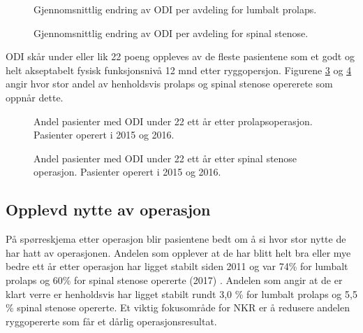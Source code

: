 \begin{figure}[h] 
\caption{Gjennomsnittlig endring av ODI per avdeling for lumbalt prolaps.}
\label{fig:OswEndrAvdPro}
\end{figure}

\begin{figure}[h] 
\caption{Gjennomsnittlig endring av ODI per avdeling for spinal stenose.}
\label{fig:OswEndrAvdSS}
\end{figure}



\clearpage


ODI skår under eller lik 22 poeng oppleves av de fleste pasientene som et godt og helt akseptabelt fysisk funksjonsnivå 12 mnd etter ryggopersjon. Figurene \ref{fig:Osw22Pro} og \ref{fig:Osw22SS} angir hvor stor andel av henholdsvis prolaps og spinal stenose opererete som oppnår dette.

\begin{figure}[ht]
\caption{\label{fig:Osw22Pro}   Andel pasienter med ODI under 22 ett år
      etter prolapsoperasjon. Pasienter operert i 2015 og 2016.}
\end{figure}

\begin{figure}[ht]
\caption{\label{fig:Osw22SS}   Andel pasienter med ODI under 22 ett år
      etter spinal stenose operasjon. Pasienter operert i 2015 og 2016.}
\end{figure}


\clearpage

\subsection{Opplevd nytte av operasjon}
På spørreskjema etter operasjon blir pasientene bedt om å si hvor stor nytte de har hatt av operasjonen.
Andelen som opplever at de har blitt helt bra eller mye bedre ett år etter operasjon har ligget stabilt siden 2011 og var 74\% for lumbalt prolaps og 60\% for spinal stenose opererte (2017) . Andelen  som angir at de er klart verre er henholdsvis har ligget stabilt rundt 3,0 \% for lumbalt prolaps og 5,5 \% spinal stenose opererte.
Et viktig fokusområde for NKR er å redusere andelen ryggopererte som får et dårlig operasjonsresultat.




